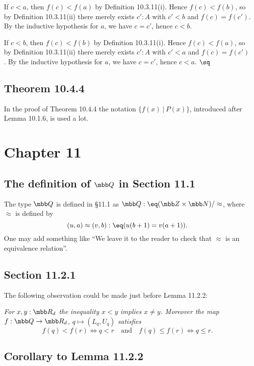 \documentclass[12pt]{article}
\begin{document}
If $c<a$, then $f(c)<f(a)$ by Definition 10.3.11(i). Hence $f(c)<f(b)$, so by Definition 10.3.11(ii) there merely exists $c':A$ with $c'<b$ and $f(c)=f(c')$. By the inductive hypothesis for $a$, we have $c=c'$, hence $c<b$. 

If $c<b$, then $f(c)<f(b)$ by Definition 10.3.11(i). Hence $f(c)<f(a)$, so by Definition 10.3.11(ii) there merely exists $c':A$ with $c'<a$ and $f(c)=f(c')$. By the inductive hypothesis for $a$, we have $c=c'$, hence $c<a$. $\sq$


\subsection{Theorem 10.4.4}

In the proof of Theorem 10.4.4 the notation $\{f(x)\ \vert\ P(x)\}$, introduced after Lemma 10.1.6, is used a lot.


\section{Chapter 11}

\subsection[The definition of Q in Section 11.1]{The definition of $\mbb Q$ in Section 11.1}

The type $\mbb Q$ is defined in \S11.1 as $\mbb Q:\eq(\mbb Z\times\mbb N)/\approx$, where $\approx$ is defined by 
$$
(u,a)\approx(v,b):\eq(u(b+1)=v(a+1)).
$$ 
One may add something like ``We leave it to the reader to check that $\approx$ is an equivalence relation''.


\subsection{Section 11.2.1}

The following observation could be made just before Lemma 11.2.2: 

\nn\emph{For $x,y:\mbb R_d$ the inequality $x<y$ implies $x\neq y$. Moreover the map $f:\mbb Q\to\mbb R_d$, $q\mapsto(L_q,U_q)$ satisfies}
$$
f(q)<f(r)\iff q<r\quad\text{and}\quad f(q)\le f(r)\iff q\le r.
$$ 


\subsection{Corollary to Lemma 11.2.2}\label{1122}
\end{document}
